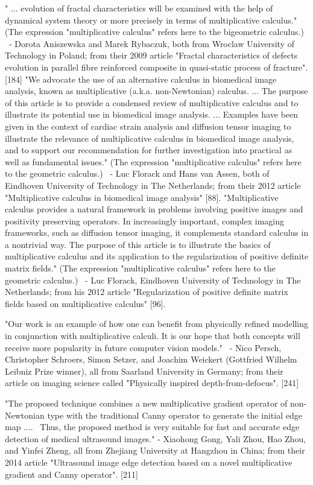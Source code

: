 \documentclass[12pt]{article}
\begin{document}
" ... evolution of fractal characteristics will be examined with the help of dynamical system theory or more precisely in terms of multiplicative calculus." (The expression "multiplicative calculus" refers here to the bigeometric calculus.)  - Dorota Aniszewska and Marek Rybaczuk, both from Wroclaw University of Technology in Poland; from their 2009 article "Fractal characteristics of defects evolution in parallel fibre reinforced composite in quasi-static process of fracture". [184]
"We advocate the use of an alternative calculus in biomedical image analysis, known as multiplicative (a.k.a. non-Newtonian) calculus. ... The purpose of this article is to provide a condensed review of multiplicative calculus and to illustrate its potential use in biomedical image analysis. ... Examples have been given in the context of cardiac strain analysis and diffusion tensor imaging to illustrate the relevance of multiplicative calculus in biomedical image analysis, and to support our recommendation for further investigation into practical as well as fundamental issues." (The expression "multiplicative calculus" refers here to the geometric calculus.)  - Luc Florack and Hans van Assen, both of Eindhoven University of Technology in The Netherlands; from their 2012 article "Multiplicative calculus in biomedical image analysis" [88].
"Multiplicative calculus provides a natural framework in problems involving positive images and positivity preserving operators. In increasingly important, complex imaging frameworks, such as diffusion tensor imaging, it complements standard calculus in a nontrivial way. The purpose of this article is to illustrate the basics of multiplicative calculus and its application to the regularization of positive definite matrix fields." (The expression "multiplicative calculus" refers here to the geometric calculus.)
 - Luc Florack, Eindhoven University of Technology in The Netherlands; from his 2012 article "Regularization of positive definite matrix fields based on multiplicative calculus" [96].

"Our work is an example of how one can benefit from physically refined modelling in conjunction with multiplicative calculi. It is our hope that both concepts will receive more popularity in future computer vision models." 
 - Nico Persch, Christopher Schroers, Simon Setzer, and Joachim Weickert (Gottfried Wilhelm Leibniz Prize winner), all from Saarland University in Germany; from their article on imaging science called "Physically inspired depth-from-defocus". [241]

"The proposed technique combines a new multiplicative gradient operator of non-Newtonian type with the traditional Canny operator to generate the initial edge map ....  Thus, the proposed method is very suitable for fast and accurate edge detection of medical ultrasound images."
- Xiaohong Gong, Yali Zhou, Hao Zhou, and Yinfei Zheng, all from Zhejiang University at Hangzhou in China; from their 2014 article "Ultrasound image edge detection based on a novel multiplicative gradient and Canny operator". [211]
\end{document}
